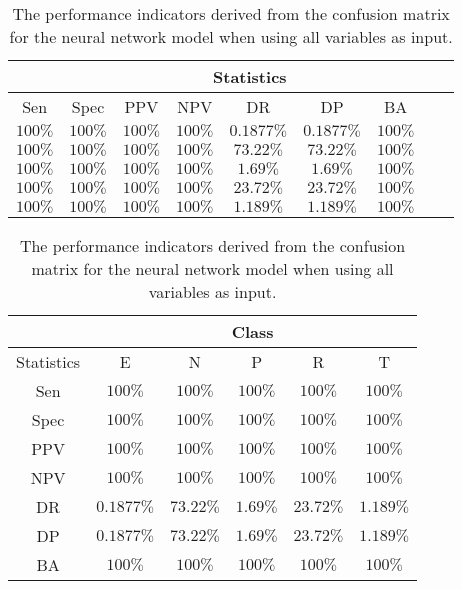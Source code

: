 \begin{table}[!ht]
	\centering
	\begin{tabular}{|c|c|c|c|c|c|c|c|c|}
		\hline
		 & \multicolumn{7}{c|}{Statistics} \\ \hline
		Sen & Spec & PPV & NPV & DR & DP & BA \\ \hline
		$100\%$ & $100\%$ & $100\%$ & $100\%$ & $0.1877\%$ & $0.1877\%$ & $100\%$ \\ \hline
		$100\%$ & $100\%$ & $100\%$ & $100\%$ & $73.22\%$ & $73.22\%$ & $100\%$ \\ \hline
		$100\%$ & $100\%$ & $100\%$ & $100\%$ & $1.69\%$ & $1.69\%$ & $100\%$ \\ \hline
		$100\%$ & $100\%$ & $100\%$ & $100\%$ & $23.72\%$ & $23.72\%$ & $100\%$ \\ \hline
		$100\%$ & $100\%$ & $100\%$ & $100\%$ & $1.189\%$ & $1.189\%$ & $100\%$ \\ \hline
	\end{tabular}
	\caption{The performance indicators derived from the confusion matrix for the neural network model when using all variables as input.}
	\label{tab:cs:all:nnet}
\end{table}

\begin{table}[!ht]
	\centering
	\begin{tabular}{|c|c|c|c|c|c|}
		\hline
		 & \multicolumn{5}{c|}{Class} \\ \hline
		Statistics & E & N & P & R & T \\ \hline
		Sen & $100\%$ & $100\%$ & $100\%$ & $100\%$ & $100\%$ \\ \hline
		Spec & $100\%$ & $100\%$ & $100\%$ & $100\%$ & $100\%$ \\ \hline
		PPV & $100\%$ & $100\%$ & $100\%$ & $100\%$ & $100\%$ \\ \hline
		NPV & $100\%$ & $100\%$ & $100\%$ & $100\%$ & $100\%$ \\ \hline
		DR & $0.1877\%$ & $73.22\%$ & $1.69\%$ & $23.72\%$ & $1.189\%$ \\ \hline
		DP & $0.1877\%$ & $73.22\%$ & $1.69\%$ & $23.72\%$ & $1.189\%$ \\ \hline
		BA & $100\%$ & $100\%$ & $100\%$ & $100\%$ & $100\%$ \\ \hline
	\end{tabular}
	\caption{The performance indicators derived from the confusion matrix for the neural network model when using all variables as input.}
	\label{tab:cs:reverse:all:nnet}
\end{table}
